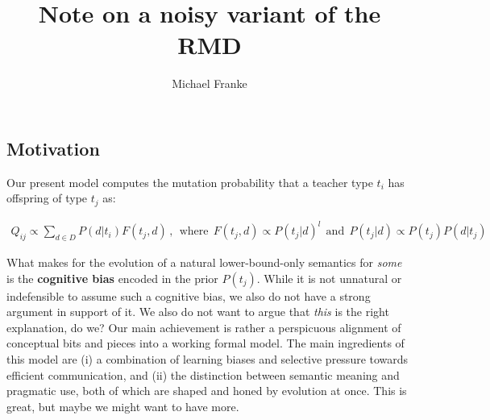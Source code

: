 \documentclass[fleqn,reqno,10pt]{article}
\title{Note on a noisy variant of the RMD}
\author{Michael Franke}
\date{}
\begin{document}
\maketitle

\subsection*{Motivation}

Our present model computes the mutation probability that a teacher type $t_i$ has
offspring of type $t_j$ as:

\begin{align*}
  Q_{ij}  \propto \sum_{d \in D} P(d|t_i) F(t_j,d) \,, \ \  \text{where} \ \
F(t_j,d)  \propto P(t_j|d)^l \ \  \text{and} \ \ P(t_j|d) \propto P(t_j) P(d|t_j)
\end{align*}

\noindent What makes for the evolution of a natural lower-bound-only semantics for \emph{some}
is the \textbf{cognitive bias} encoded in the prior $P({t_j})$. While it is not unnatural or
indefensible to assume such a cognitive bias, we also do not have a strong argument in support
of it. We also do not want to argue that \emph{this} is the right explanation, do we? Our main
achievement is rather a perspicuous alignment of conceptual bits and pieces into a working
formal model. The main ingredients of this model are (i) a combination of learning biases and
selective pressure towards efficient communication, and (ii) the distinction between semantic
meaning and pragmatic use, both of which are shaped and honed by evolution at once. This is
great, but maybe we might want to have more.
\end{document}
